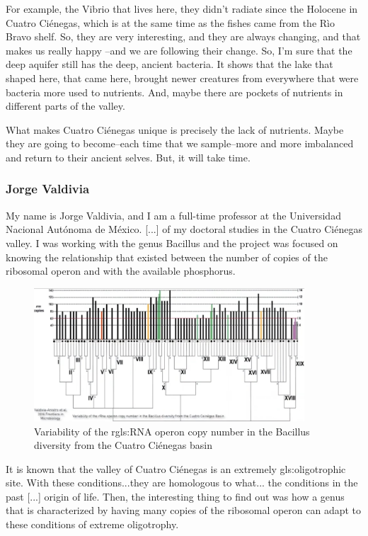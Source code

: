 \documentclass[]{article}
\begin{document}
For example, the Vibrio that lives here, they didn't radiate since the Holocene in Cuatro  Ci\'enegas, which is at the same time as the fishes came from the R\`io Bravo shelf. So, they are very interesting, and they are always changing, and that makes us really happy --and we are following their change. So, I'm sure that the deep aquifer still has the deep, ancient bacteria. It shows that the lake that shaped here, that came here, brought newer creatures from everywhere that were bacteria more used to nutrients. And, maybe there are pockets of nutrients in different parts of the valley.

What makes Cuatro  Ci\'enegas unique is precisely the lack of nutrients. Maybe they are going to become--each time that we sample--more and more imbalanced and return to their ancient selves. But, it will take time.

\subsubsection{Jorge Valdivia}

My name is Jorge Valdivia, and I am a full-time professor at the Universidad Nacional Aut\'onoma de M\'exico. [...] of my doctoral studies in the Cuatro  Ci\'enegas valley. I was working with the genus Bacillus and the project was focused on knowing the relationship that existed between the number of copies of the ribosomal operon and with the available phosphorus.
\begin{figure}[H]
	\caption[Variability of the r\gls{gls:RNA} operon copy number]{Variability of the r\gls{gls:RNA} operon copy number in the Bacillus diversity from the Cuatro  Ci\'enegas basin\cite{valdivia2016variability}} 
	\includegraphics[width=0.9\textwidth]{CuatroCienegas8}
\end{figure}

It is known that the valley of Cuatro  Ci\'enegas is an extremely \gls{gls:oligotroph}ic site. With these conditions...they are homologous to what... the conditions in the past [...] origin of life. Then, the interesting thing to find out was how a genus that is characterized by having many copies of the ribosomal operon can adapt to these conditions of extreme oligotrophy.
\end{document}
